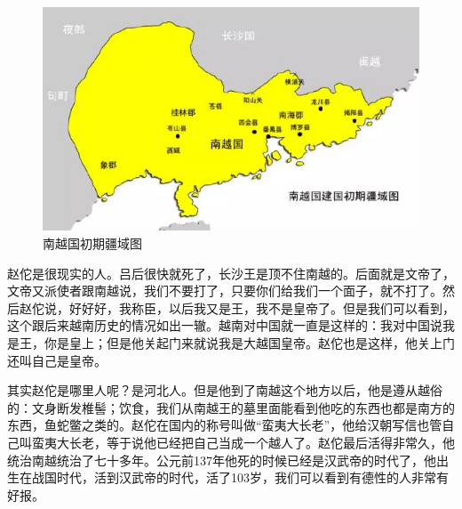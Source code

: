 \begin{figure}
	\centering
	\includegraphics[width=\textwidth]{images/image-8}
	\caption{南越国初期疆域图}
\end{figure}

赵佗是很现实的人。吕后很快就死了，长沙王是顶不住南越的。后面就是文帝了，文帝又派使者跟南越说，我们不要打了，只要你们给我们一个面子，就不打了。然后赵佗说，好好好，我称臣，以后我又是王，我不是皇帝了。但是我们可以看到，这个跟后来越南历史的情况如出一辙。越南对中国就一直是这样的：我对中国说我是王，你是皇上；但是他关起门来就说我是大越国皇帝。赵佗也是这样，他关上门还叫自己是皇帝。

其实赵佗是哪里人呢？是河北人。但是他到了南越这个地方以后，他是遵从越俗的：文身断发椎髻；饮食，我们从南越王的墓里面能看到他吃的东西也都是南方的东西，鱼蛇鳖之类的。赵佗在国内的称号叫做“蛮夷大长老”，他给汉朝写信也管自己叫蛮夷大长老，等于说他已经把自己当成一个越人了。赵佗最后活得非常久，他统治南越统治了七十多年。公元前137年他死的时候已经是汉武帝的时代了，他出生在战国时代，活到汉武帝的时代，活了103岁，我们可以看到有德性的人非常有好报。


